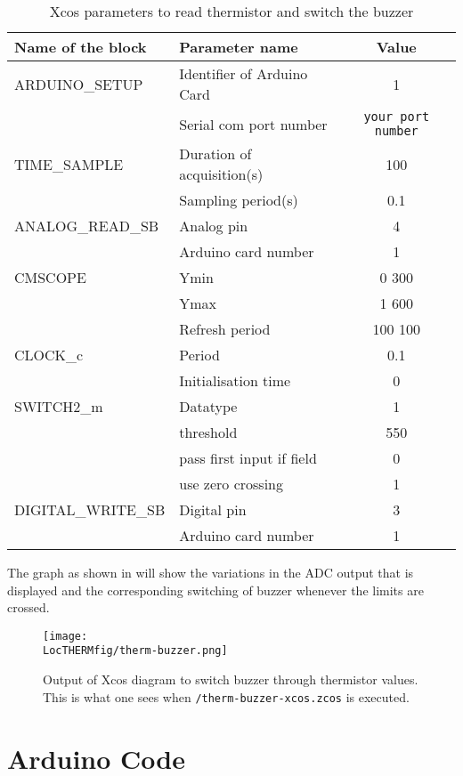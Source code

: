 \begin{enumerate}
\begin{table}
    \centering
    \caption{Xcos parameters to read thermistor and switch the buzzer}
    \label{tab:ldr-led}
    \begin{tabular}{llc} \hline
      Name of the block & Parameter name & Value \\ \hline
      ARDUINO\_SETUP & Identifier of Arduino Card & 1 \\
      & Serial com port number & {\tt your port number} \\ \hline
      TIME\_SAMPLE & Duration of acquisition(s) & 100 \\
      & Sampling period(s) & 0.1 \\ \hline
      ANALOG\_READ\_SB & Analog pin & 4 \\
      & Arduino card number & 1 \\ \hline
      CMSCOPE & Ymin & 0 300 \\ 
      & Ymax & 1 600 \\
      & Refresh period & 100 100 \\ \hline
      CLOCK\_c & Period & 0.1 \\
      & Initialisation time & 0 \\ \hline
      SWITCH2\_m & Datatype & 1 \\
      & threshold & 550 \\
      & pass first input if field & 0 \\
      & use zero crossing & 1 \\ \hline
      DIGITAL\_WRITE\_SB & Digital pin & 3 \\
      & Arduino card number & 1 \\ \hline
    \end{tabular}
  \end{table}
The graph as shown in  will show the variations in the ADC output that is displayed and the corresponding switching of buzzer whenever the limits are crossed.
\begin{figure}
    \centering
    \texttt{[image: \\LocTHERMfig/therm-buzzer.png]}
    \caption[Output of Xcos diagram to switch buzzer through thermistor values]{Output of Xcos diagram to switch buzzer through thermistor values. This is what one sees when {\tt \LocTHERMscibrief/therm-buzzer-xcos.zcos} is executed.}
    \label{fig:therm-buzzer-output}
  \end{figure}
\end{enumerate}

\section{Arduino Code}
\label{sec:therm-arduino-code}

